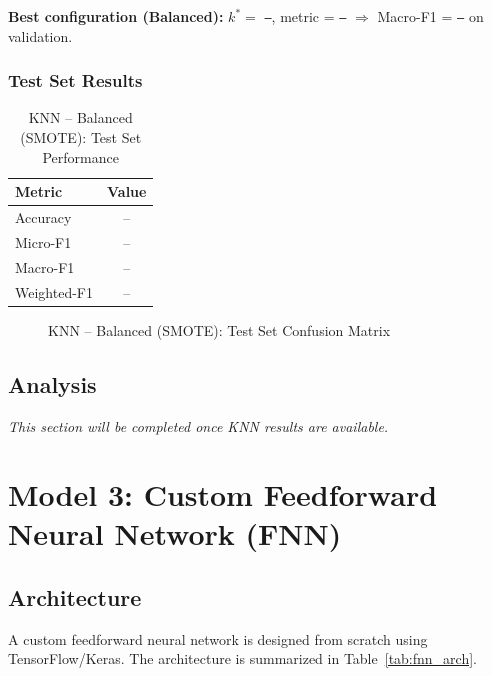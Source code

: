 \documentclass[12pt,a4paper]{article}
\begin{document}
\noindent\textbf{Best configuration (Balanced):} $k^* =$ \texttt{--}, metric = \texttt{--} $\Rightarrow$ Macro-F1 = \texttt{--} on validation.

\subsubsection{Test Set Results}

\begin{table}[H]
    \centering
    \caption{KNN -- Balanced (SMOTE): Test Set Performance}
    \label{tab:knn_balanced_test}
    \begin{tabular}{lc}
        \toprule
        \textbf{Metric} & \textbf{Value} \\
        \midrule
        Accuracy    & -- \\
        Micro-F1    & -- \\
        Macro-F1    & -- \\
        Weighted-F1 & -- \\
        \bottomrule
    \end{tabular}
\end{table}

\begin{figure}[H]
    \centering
    \caption{KNN -- Balanced (SMOTE): Test Set Confusion Matrix}
    \label{fig:knn_balanced_cm}
\end{figure}

\subsection{Analysis}

\textit{This section will be completed once KNN results are available.}

\section{Model 3: Custom Feedforward Neural Network (FNN)}

\subsection{Architecture}

A custom feedforward neural network is designed from scratch using TensorFlow/Keras. The architecture is summarized in Table~\ref{tab:fnn_arch}.
\end{document}
